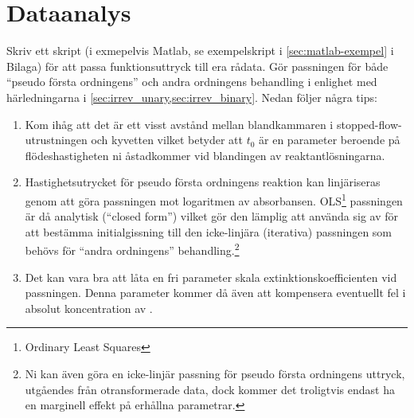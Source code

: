 \section{Dataanalys}
\label{sec:analys}
Skriv ett skript (i exmepelvis Matlab, se exempelskript i
\cref{sec:matlab-exempel} i Bilaga) för att passa funktionsuttryck 
till era rådata. Gör passningen för både ``pseudo första ordningens''
och andra ordningens behandling i enlighet med härledningarna i
\cref{sec:irrev_unary,sec:irrev_binary}. Nedan följer några tips:

\begin{enumerate}
\item Kom ihåg att det är ett visst
  avstånd mellan blandkammaren i stopped-flow-utrustningen och
  kyvetten vilket betyder att $t_0$ är en parameter beroende på
  flödeshastigheten ni åstadkommer vid blandingen av reaktantlösningarna.
\item Hastighetsutrycket för pseudo första ordningens reaktion kan
  linjäriseras genom att göra passningen mot logaritmen av
  absorbansen. OLS\footnote{Ordinary Least Squares} passningen är
  då analytisk (``closed form'') vilket gör den lämplig att använda sig av för
  att bestämma initialgissning till den icke-linjära (iterativa)
  passningen som behövs för ``andra ordningens'' behandling.\footnote{
  Ni kan även göra en icke-linjär passning för pseudo första ordningens
  uttryck,   utgåendes från otransformerade data, dock kommer det
  troligtvis endast ha en marginell effekt på erhållna parametrar.}
\item Det kan vara bra att låta en fri parameter skala
  extinktionskoefficienten vid passningen. Denna parameter kommer då även
  att kompensera eventuellt fel i absolut koncentration av .
\end{enumerate}

